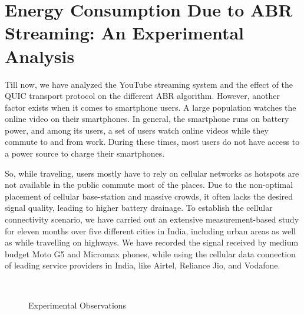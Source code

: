 
\graphicspath{{Chapters/03.DASH/img/}}

\section{Energy Consumption Due to ABR Streaming: An Experimental Analysis}
\label{sec:chap03:DASHinMobility}

Till now, we have analyzed the YouTube streaming system and the effect of the \ac{QUIC} transport protocol on the different \ac{ABR} algorithm. However, another factor exists when it comes to smartphone users. A large population watches the online video on their smartphones. In general, the smartphone runs on battery power, and among its users, a set of users watch online videos while they commute to and from work. During these times, most users do not have access to a power source to charge their smartphones.

So, while traveling, users mostly have to rely on cellular networks as  hotspots are not available in the public commute most of the places. Due to the non-optimal placement of cellular base-station and massive crowds, it often lacks the desired signal quality, leading to higher battery drainage. To establish the cellular connectivity scenario, we have carried out an extensive measurement-based study for eleven months over five different cities in India, including urban areas as well as while travelling on highways. We have recorded the signal received by medium budget Moto G5 and Micromax phones, while using the cellular data connection of leading service providers in India, like Airtel, Reliance Jio, and Vodafone.


\begin{figure}[!h]
	\captionsetup[subfigure]{width=0.7\linewidth}
	\begin{center}
		\\
		\vspace{+5mm}
	\end{center}
	\caption{ Experimental Observations}
\end{figure}



